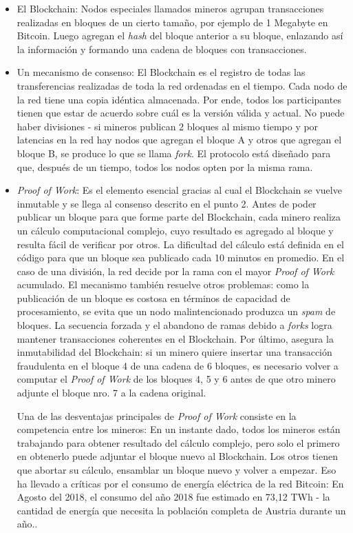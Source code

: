 \begin{itemize}
\item El Blockchain: Nodos especiales llamados mineros agrupan transacciones realizadas en bloques de un cierto tamaño, por ejemplo de 1 Megabyte en Bitcoin. Luego agregan el \textit{hash} del bloque anterior a su bloque, enlazando así la información y formando una cadena de bloques con transacciones. 

\item Un mecanismo de consenso: El Blockchain es el registro de todas las transferencias realizadas de toda la red ordenadas en el tiempo. Cada nodo de la red tiene una copia idéntica almacenada. Por ende, todos los participantes tienen que estar de acuerdo sobre cuál es la versión válida y actual. No puede haber divisiones - si mineros publican 2 bloques al mismo tiempo y por latencias en la red hay nodos que agregan el bloque A y otros que agregan el bloque B, se produce lo que se llama \textit{fork}. El protocolo está diseñado para que, después de un tiempo, todos los nodos opten por la misma rama.

\item \textit{Proof of Work}: Es el elemento esencial gracias al cual el Blockchain se vuelve inmutable y se llega al consenso descrito en el punto 2. Antes de poder publicar un bloque para que forme parte del Blockchain, cada minero realiza un cálculo computacional complejo, cuyo resultado es agregado al bloque y resulta fácil de verificar por otros. La dificultad del cálculo está definida en el código para que un bloque sea publicado cada 10 minutos en promedio. En el caso de una división, la red decide por la rama con el mayor \textit{Proof of Work} acumulado. El mecanismo también resuelve otros problemas: como la publicación de un bloque es costosa en términos de capacidad de procesamiento, se evita que un nodo malintencionado produzca un \textit{spam} de bloques. La secuencia forzada y el abandono de ramas debido a \textit{forks} logra mantener transacciones coherentes en el Blockchain. %
Por último, asegura la inmutabilidad del Blockchain: si un minero quiere insertar una transacción fraudulenta en el bloque 4 de una cadena de 6 bloques, es necesario volver a computar el \textit{Proof of Work} de los bloques 4, 5 y 6 antes de que otro minero adjunte el bloque nro. 7 a la cadena original.

Una de las desventajas principales de \textit{Proof of Work} consiste en la competencia entre los mineros: En un instante dado, todos los mineros están trabajando para obtener resultado del cálculo complejo, pero solo el primero en obtenerlo puede adjuntar el bloque nuevo al Blockchain. Los otros tienen que abortar su cálculo, ensamblar un bloque nuevo y volver a empezar. Eso ha llevado a críticas por el consumo de energía eléctrica de la red Bitcoin: En Agosto del 2018, el consumo del año 2018 fue estimado en 73,12 TWh - la cantidad de energía que necesita la población completa de Austria durante un año.\cite{bitcoin_energy}.

\end{itemize}

